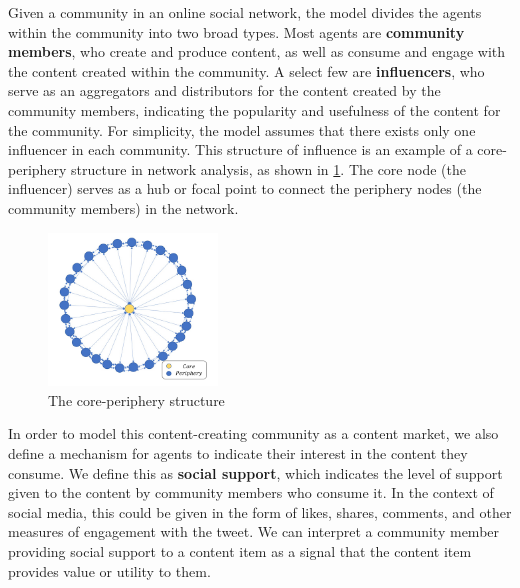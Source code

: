 \documentclass[11pt, letterpaper]{article}
\begin{document}
Given a community in an online social network, the model divides the agents within the community into two broad types. Most agents are \textbf{community members}, who create and produce content, as well as consume and engage with the content created within the community. A select few are \textbf{influencers}, who serve as an aggregators and distributors for the content created by the community members, indicating the popularity and usefulness of the content for the community. For simplicity, the model assumes that there exists only one influencer in each community. This structure of influence is an example of a core-periphery structure in network analysis, as shown in \cref{fig:core-periphery}. The core node (the influencer) serves as a hub or focal point to connect the periphery nodes (the community members) in the network.

\begin{figure}[h]
    \centering
    \includegraphics[width=0.4\textwidth]{figures/core-periphery.png}
    \caption{The core-periphery structure}
    \label{fig:core-periphery}
\end{figure}

In order to model this content-creating community as a content market, we also define a mechanism for agents to indicate their interest in the content they consume. We define this as \textbf{social support}, which indicates the level of support given to the content by community members who consume it. In the context of social media, this could be given in the form of likes, shares, comments, and other measures of engagement with the tweet. We can interpret a community member providing social support to a content item as a signal that the content item provides value or utility to them.
\end{document}
